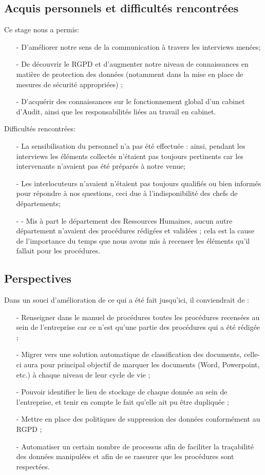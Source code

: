 \subsection{Acquis personnels et difficultés rencontrées}
Ce stage nous a permis:
\begin{itemize}
    \item[-] D'améliorer notre sens de la communication à travers les interviews menées;
    \item[-] De découvrir le RGPD et d’augmenter notre niveau de connaissances en matière de protection des données (notamment dans la mise en place de mesures de sécurité appropriées) ;
    \item[-] D’acquérir des connaissances sur le fonctionnement global d’un cabinet d’Audit, ainsi que les responsabilités liées au travail en cabinet.
\end{itemize}
Difficultés rencontrées:
\begin{itemize}
    \item[-] La sensibilisation du personnel n’a pas été effectuée : ainsi, pendant les interviews les éléments collectés n’étaient pas toujours pertinents car les intervenants n’avaient pas été préparés à notre venue;
    \item[-] Les interlocuteurs n’avaient n’étaient pas toujours qualifiés ou bien informés pour répondre à nos questions, ceci due à l’indisponibilité des chefs de départements;
    \item[-] -	Mis à part le département des Ressources Humaines, aucun autre département n’avaient des procédures rédigées et validées ; cela est la cause de l’importance du temps que nous avons mis à recenser les éléments qu’il fallait pour les procédures.
\end{itemize}

\subsection{Perspectives}
Dans un souci d’amélioration de ce qui a été fait jusqu’ici, il conviendrait de :
\begin{itemize}
    \item[-]Renseigner dans le manuel de procédures toutes les procédures recensées au sein de l’entreprise car ce n’est qu’une partie des procédures qui a été rédigée ;
    \item[-]Migrer vers une solution automatique de classification des documents, celle-ci aura pour principal objectif de marquer les documents (Word, Powerpoint, etc.) à chaque niveau de leur cycle de vie ;
    \item[-] Pouvoir identifier le lieu de stockage de chaque donnée au sein de l’entreprise, et tenir en compte le fait qu’elle ait pu être dupliquée ;
    \item[-] Mettre en place des politiques de suppression des données conformément au RGPD ;
    \item[-] Automatiser un certain nombre de processus afin de faciliter la traçabilité des données manipulées et afin de se rassurer que les procédures sont respectées.
\end{itemize}

